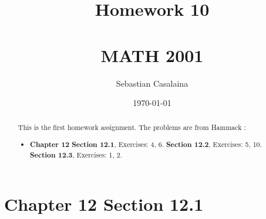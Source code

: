 \documentclass[12pt]{amsart}
\numberwithin{equation}{section}
\theoremstyle{definition}
\theoremstyle{remark}
\begin{document}




\author[Casalaina]{Sebastian Casalaina}
\address{University of Colorado, Department of Mathematics,  Campus Box 395,
Boulder, CO 80309-0395}
\date{\today}



\title[Homework 10]{Homework 10 \\ \ \\  MATH 2001}

\begin{abstract} 
This is the first homework assignment.  The problems are from Hammack \cite[Ch.~1, \S 1.1]{H13}:
\begin{itemize}

\item \textbf{Chapter 12}  
\textbf{Section 12.1}, Exercises:  4, 6.
\textbf{Section 12.2}, Exercises:  5, 10.
\textbf{Section 12.3}, Exercises:  1, 2.

\end{itemize}
\end{abstract}


\maketitle


\tableofcontents





\section*{Chapter 12 Section 12.1}


\end{document}
